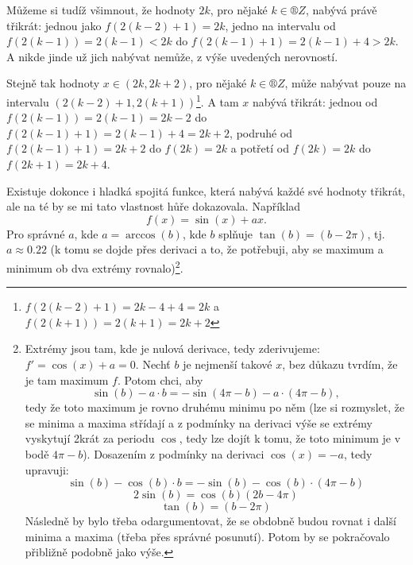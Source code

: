 \documentclass[12pt]{article}					%
\begin{document}
\begin{priklad}
\begin{reseni}
        Můžeme si tudíž všimnout, že hodnoty $2k$, pro nějaké $k \in ®Z$, nabývá právě třikrát: jednou jako $f(2(k-2)+1) = 2k$, jedno na intervalu od $f(2(k-1)) = 2(k-1) < 2k$ do $f(2(k-1)+1) = 2(k-1)+4 > 2k$. A nikde jinde už jich nabývat nemůže, z výše uvedených nerovností.

        Stejně tak hodnoty $x \in (2k, 2k+2)$, pro nějaké $k \in ®Z$, může nabývat pouze na intervalu $(2(k-2)+1, 2(k+1))$\footnote{$f(2(k-2)+1) = 2k-4+4 = 2k$ a $f(2(k+1)) = 2(k+1) = 2k+2$}. A tam $x$ nabývá třikrát: jednou od $f(2(k-1)) = 2(k-1) = 2k-2$ do $f(2(k-1) + 1) = 2(k-1) + 4 = 2k+2$, podruhé od $f(2(k-1) + 1) = 2k+2$ do $f(2k) = 2k$ a potřetí od $f(2k) = 2k$ do $f(2k+1) = 2k+4$.


    \end{reseni}

    \begin{poznamkain}
        Existuje dokonce i hladká spojitá funkce, která nabývá každé své hodnoty třikrát, ale na té by se mi tato vlastnost hůře dokazovala. Například
        $$ f(x) = \sin(x) + ax. $$
        Pro správné $a$, kde $a = \arccos(b)$, kde $b$ splňuje $\tan(b) = (b - 2\pi)$, tj. $a \approx 0.22$ (k tomu se dojde přes derivaci a to, že potřebuji, aby se maximum a minimum ob dva extrémy rovnalo)\footnote{Extrémy jsou tam, kde je nulová derivace, tedy zderivujeme: $f' = \cos(x) + a = 0$. Nechť $b$ je nejmenší takové $x$, bez důkazu tvrdím, že je tam maximum $f$. Potom chci, aby $$ \sin(b) - a·b = -\sin(4\pi - b) - a·(4\pi - b), $$ tedy že toto maximum je rovno druhému minimu po něm (lze si rozmyslet, že se minima a maxima střídají a z podmínky na derivaci výše se extrémy vyskytují 2krát za periodu $\cos$, tedy lze dojít k tomu, že toto minimum je v bodě $4\pi - b$). Dosazením z podmínky na derivaci $\cos(x) = -a$, tedy upravuji: $$ \sin(b) - \cos(b)·b = -\sin(b) - \cos(b)·(4\pi - b) $$ $$ 2\sin(b) = \cos(b)(2b - 4\pi) $$ $$ \tan(b) = (b - 2\pi) $$ Následně by bylo třeba odargumentovat, že se obdobně budou rovnat i další minima a maxima (třeba přes správné posunutí). Potom by se pokračovalo přibližně podobně jako výše.}.
    \end{poznamkain}
\end{priklad}
\end{document}
